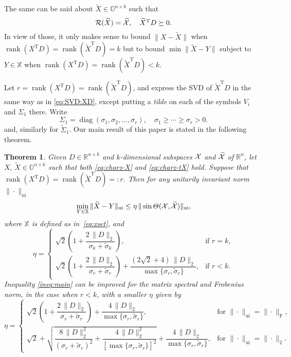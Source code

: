 \documentclass[11pt]{article}
\def\bbO{\mathbb{O}}
\def\bbR{\mathbb{R}}
\def\bbX{\mathbb{X}}
\def\cR{{\cal R}}
\def\cX{{\cal X}}
\DeclareMathOperator{\diag}{diag}
\DeclareMathOperator{\rank}{rank}
\DeclareMathOperator{\F}{F}
\DeclareMathOperator{\T}{T}
\DeclareMathOperator{\UI}{ui}
\def\wtd{\widetilde}
\newtheorem{theorem}{Theorem}[section]
\theoremstyle{definition}
\numberwithin{equation}{section}
\numberwithin{figure}{section}
\numberwithin{table}{section}
\begin{document}
The same can be said about $\wtd X\in\bbO^{n\times k}$ such that
\begin{equation}\label{eq:charz-tX}
\cR(\wtd X)=\wtd\cX, \quad \wtd X^{\T}D\succeq 0.
\end{equation}
In view of those, it only makes sense to bound $\|X-\wtd X\|$ when $\rank(X^{\T}D)=\rank(\wtd X^{\T}D)=k$ but to bound
$\min \|\wtd X-Y\|$ subject to $Y\in\bbX$ when $\rank(X^{\T}D)=\rank(\wtd X^{\T}D)<k$.


Let $r=\rank(X^{\T}D)=\rank(\wtd X^{\T}D)$, and express the SVD of
$\wtd X^{\T}D$ in the same way as in \eqref{eq:SVD:XD}, except putting a {\em tilde\/} on
each of the symbols $V_i$ and $\Sigma_1$ there. Write
\begin{equation}\label{eq:Sigma1}
\Sigma_1=\diag(\sigma_1,\sigma_2,\ldots,\sigma_r),\quad
\sigma_1\ge\cdots\ge\sigma_r>0.
\end{equation}
and, similarly for $\wtd\Sigma_1$.
Our main result of this paper is stated in the following theorem.

\begin{theorem} \label{thm:main}
Given $D\in\bbR^{n\times k}$ and $k$-dimensional subspaces $\cX$ and $\wtd\cX$ of $\bbR^n$,
let $X,\,\wtd X\in\bbO^{n\times k}$ such that both \eqref{eq:charz-X} and \eqref{eq:charz-tX} hold.
Suppose that $\rank(X^{\T}D)=\rank(\wtd X^{\T}D)=:r$.
Then for any unitarily invariant norm $\|\cdot\|_{\UI}$
\begin{equation} \label{ineq:main}
\min_{Y\in\bbX}\|\wtd X-Y\|_{\UI}\le\eta\,\|\sin\Theta(\cX,\wtd\cX)\|_{\UI},
\end{equation}
where $\bbX$ is defined as in~\eqref{eq:xset}, and
\begin{equation}\label{eq:main-eta}
\eta=
\begin{cases}
  \sqrt 2\left(1+\dfrac{2\,\|D\|_2}{\sigma_k+\tilde\sigma_k}\right),  &  \mbox{if $r=k$},\\[1em]
  \sqrt 2\left(1+\dfrac{2\,\|D\|_2}{\sigma_r+\tilde\sigma_r}\right)+\dfrac{(2\sqrt 2+4)\,\|D\|_2}{\max\{\sigma_r,\tilde\sigma_r\}},&\mbox{if $r<k$}.
\end{cases}
\end{equation}
Inequality \eqref{ineq:main} can be improved for  the matrix spectral and Frobenius norm,
in the case when $r<k$, with a smaller $\eta$ given by
\begin{equation}\label{eq:main-eta'}
\eta=
\begin{cases}
  \sqrt 2\left(1+\dfrac{2\,\|D\|_2}{\sigma_r+\tilde\sigma_r}\right)
         +\dfrac{4\,\|D\|_2}{\max\{\sigma_r,\tilde\sigma_r\}},
                    &  \mbox{for $\|\cdot\|_{\UI}=\|\cdot\|_{\F}$},\\[1em]
  \sqrt 2+\sqrt{\dfrac{8\,\|D\|_2^2}{(\sigma_r+\tilde\sigma_r)^2}
             +\dfrac{4\,\|D\|_2^2}{[\max\{\sigma_r,\tilde\sigma_r\}]^2}}
             +\dfrac{4\,\|D\|_2}{\max\{\sigma_r,\tilde\sigma_r\}},
                    &\mbox{for $\|\cdot\|_{\UI}=\|\cdot\|_2$}.
\end{cases}
\end{equation}
\end{theorem}
\end{document}
